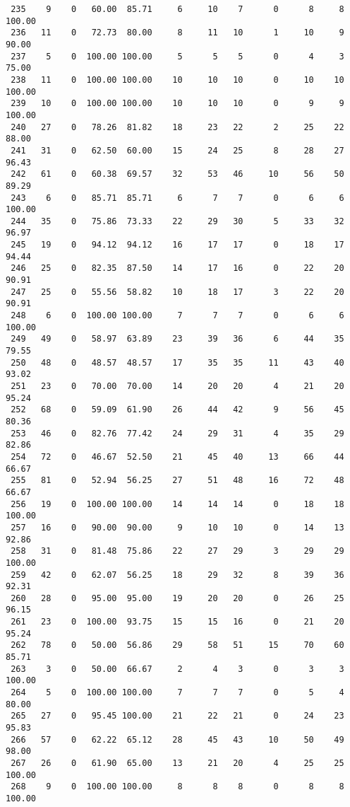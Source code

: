 \begin{verbatim}
 235    9    0   60.00  85.71     6     10    7      0      8     8   100.00
 236   11    0   72.73  80.00     8     11   10      1     10     9    90.00
 237    5    0  100.00 100.00     5      5    5      0      4     3    75.00
 238   11    0  100.00 100.00    10     10   10      0     10    10   100.00
 239   10    0  100.00 100.00    10     10   10      0      9     9   100.00
 240   27    0   78.26  81.82    18     23   22      2     25    22    88.00
 241   31    0   62.50  60.00    15     24   25      8     28    27    96.43
 242   61    0   60.38  69.57    32     53   46     10     56    50    89.29
 243    6    0   85.71  85.71     6      7    7      0      6     6   100.00
 244   35    0   75.86  73.33    22     29   30      5     33    32    96.97
 245   19    0   94.12  94.12    16     17   17      0     18    17    94.44
 246   25    0   82.35  87.50    14     17   16      0     22    20    90.91
 247   25    0   55.56  58.82    10     18   17      3     22    20    90.91
 248    6    0  100.00 100.00     7      7    7      0      6     6   100.00
 249   49    0   58.97  63.89    23     39   36      6     44    35    79.55
 250   48    0   48.57  48.57    17     35   35     11     43    40    93.02
 251   23    0   70.00  70.00    14     20   20      4     21    20    95.24
 252   68    0   59.09  61.90    26     44   42      9     56    45    80.36
 253   46    0   82.76  77.42    24     29   31      4     35    29    82.86
 254   72    0   46.67  52.50    21     45   40     13     66    44    66.67
 255   81    0   52.94  56.25    27     51   48     16     72    48    66.67
 256   19    0  100.00 100.00    14     14   14      0     18    18   100.00
 257   16    0   90.00  90.00     9     10   10      0     14    13    92.86
 258   31    0   81.48  75.86    22     27   29      3     29    29   100.00
 259   42    0   62.07  56.25    18     29   32      8     39    36    92.31
 260   28    0   95.00  95.00    19     20   20      0     26    25    96.15
 261   23    0  100.00  93.75    15     15   16      0     21    20    95.24
 262   78    0   50.00  56.86    29     58   51     15     70    60    85.71
 263    3    0   50.00  66.67     2      4    3      0      3     3   100.00
 264    5    0  100.00 100.00     7      7    7      0      5     4    80.00
 265   27    0   95.45 100.00    21     22   21      0     24    23    95.83
 266   57    0   62.22  65.12    28     45   43     10     50    49    98.00
 267   26    0   61.90  65.00    13     21   20      4     25    25   100.00
 268    9    0  100.00 100.00     8      8    8      0      8     8   100.00

\end{verbatim}
